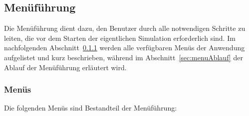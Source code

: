 \subsection{Menüführung}\label{sec:menu}
Die Menüführung dient dazu, den Benutzer durch alle notwendigen Schritte zu leiten, die vor dem Starten der eigentlichen Simulation erforderlich sind. Im nachfolgenden Abschnitt~\ref{sec:menus} werden alle verfügbaren Menüs der Anwendung aufgelistet und kurz beschrieben, während im Abschnitt~\ref{sec:menuAblauf} der Ablauf der Menüführung erläutert wird.

\subsubsection{Menüs}\label{sec:menus}
Die folgenden Menüs sind Bestandteil der Menüführung:
